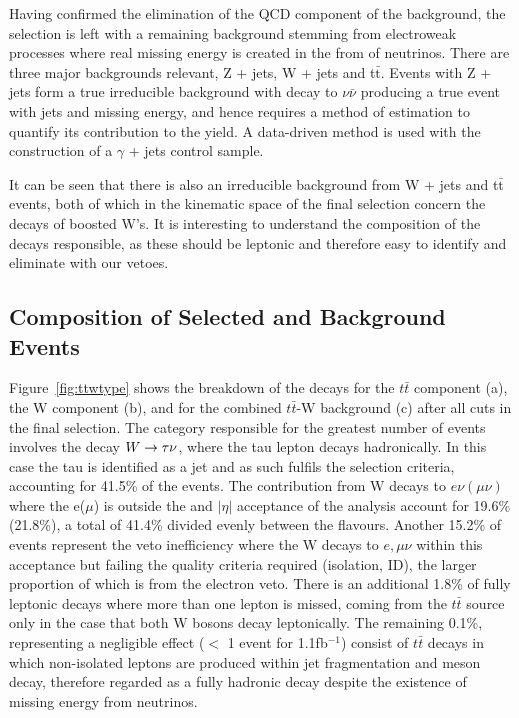 Having confirmed the elimination of the QCD component of the background, the selection is left with a remaining background stemming from electroweak processes where real missing energy is created in the from of neutrinos. There are three major backgrounds relevant, Z + jets, W + jets and t$\bar{\textrm{t}}$. Events with Z + jets form a true irreducible background with decay to $\nu \bar{\nu}$ producing a true event with jets and missing energy, and hence requires a method of estimation to quantify its contribution to the yield. A data-driven method is used with the construction of a $\gamma$ + jets control sample.

It can be seen that there is also an irreducible background from W + jets and t$\bar{\textrm{t}}$ events, both of which in the kinematic space of the final selection concern the decays of boosted W's. It is interesting to understand the composition of the decays responsible, as these should be leptonic and therefore easy to identify and eliminate with our vetoes.

\subsection{Composition of Selected \ttj and \wj Background Events}
\label{sec:ttwcomp}
Figure~\ref{fig:ttwtype} shows the breakdown of the decays for the $t\bar{t}$ component (a), the W component (b), and for the combined $t\bar{t}$-W background (c) after all cuts in the final selection. The category responsible for the greatest number of events involves the decay $W \rightarrow \tau \nu$, where the tau lepton decays hadronically. In this case the tau is identified as a jet and as such fulfils the selection criteria, accounting for 41.5\% of the events. The contribution from W decays to $e \nu(\mu \nu)$ where the e($\mu$) is outside the \Pt and $|\eta|$ acceptance of the analysis account for 19.6\%(21.8\%), a total of 41.4\% divided evenly between the flavours. Another 15.2\% of events represent the veto inefficiency where the W decays to $e, \mu \nu$ within this acceptance but failing the quality criteria required (isolation, ID), the larger proportion of which is from the electron veto. There is an additional 1.8\% of fully leptonic decays where more than one lepton is missed, coming from the $t\bar{t}$ source only in the case that both W bosons decay leptonically. The remaining 0.1\%, representing a negligible effect ($<$ 1 event for 1.1fb$^{-1}$) consist of $t\bar{t}$ decays in which non-isolated leptons are produced within jet fragmentation and meson decay, therefore regarded as a fully hadronic decay despite the existence of missing energy from neutrinos.

